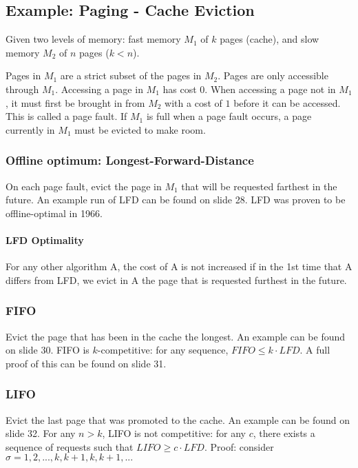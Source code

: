 \documentclass[a4paper]{article}
\begin{document}
\subsection{Example: Paging - Cache Eviction}
Given two levels of memory: fast memory $M_1$ of $k$ pages (cache), and slow memory $M_2$ of $n$ pages ($k<n$).

Pages in $M_1$ are a strict subset of the pages in $M_2$.
Pages are only accessible through $M_1$.
Accessing a page in $M_1$ has cost $0$.
When accessing a page not in $M_1$, it must first be brought in from $M_2$ with a cost of $1$ before it can be accessed. This is called a page fault.
If $M_1$ is full when a page fault occurs, a page currently in $M_1$ must be evicted to make room.

\subsubsection{Offline optimum: Longest-Forward-Distance}
On each page fault, evict the page in $M_1$ that will be requested farthest in the future.
An example run of LFD can be found on slide 28.
LFD was proven to be offline-optimal in 1966.

\paragraph{LFD Optimality}
For any other algorithm A, the cost of A is not increased if in the 1st time that A differs from LFD, we evict in A the page that is requested furthest in the future.

\subsubsection{FIFO}
Evict the page that has been in the cache the longest.
An example can be found on slide 30.
FIFO is $k$-competitive: for any sequence, $FIFO \le k \cdot LFD$.
A full proof of this can be found on slide 31.

\subsubsection{LIFO}
Evict the last page that was promoted to the cache.
An example can be found on slide 32.
For any $n>k$, LIFO is not competitive: for any $c$, there exists a sequence of requests such that $LIFO \ge c \cdot LFD$.
Proof: consider $\sigma=1,2,...,k,k+1,k,k+1,...$
\end{document}
